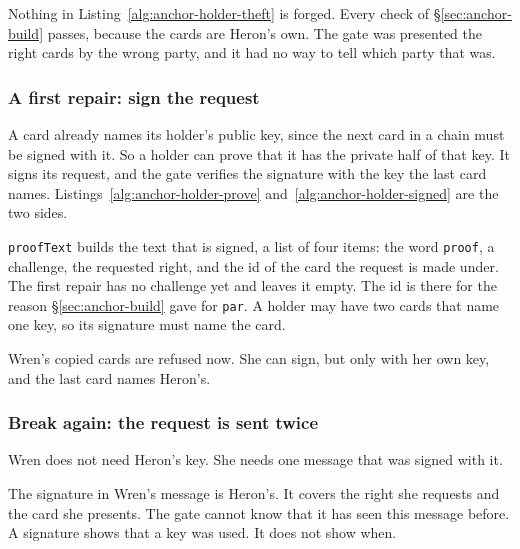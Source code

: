 Nothing in Listing~\ref{alg:anchor-holder-theft} is forged. Every check of
\S\ref{sec:anchor-build} passes, because the cards are Heron's own. The
gate was presented the right cards by the wrong party, and it had no way to
tell which party that was.

\subsubsection{A first repair: sign the request}

A card already names its holder's public key, since the next card in a
chain must be signed with it. So a holder can prove that it has the private
half of that key. It signs its request, and the gate verifies the signature
with the key the last card names. Listings~\ref{alg:anchor-holder-prove}
and~\ref{alg:anchor-holder-signed} are the two sides.

\texttt{proofText} builds the text that is signed, a list of four items:
the word \texttt{proof}, a challenge, the requested right, and the id of the
card the request is made under. The first repair has no challenge yet and
leaves it empty. The id is there for the reason \S\ref{sec:anchor-build}
gave for \texttt{par}. A holder may have two cards that name one key, so its
signature must name the card.



Wren's copied cards are refused now. She can sign, but only with her own
key, and the last card names Heron's.

\subsubsection{Break again: the request is sent twice}

Wren does not need Heron's key. She needs one message that was signed with
it.


The signature in Wren's message is Heron's. It covers the right she
requests and the card she presents. The gate cannot know that it has seen
this message before. A signature shows that a key was used. It does not show
when.

